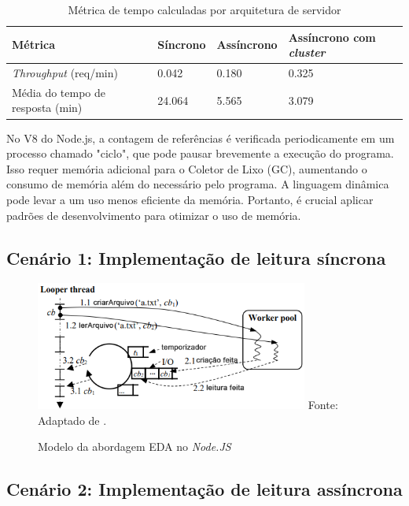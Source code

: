 \documentclass[12pt]{article}
\begin{document}
\begin{table}[!h]
\centering
\caption{Métrica de tempo calculadas por arquitetura de servidor} 
\label{tab:metrics}
\begin{tabular}{|p{3cm}|p{3cm}|p{3cm}|p{3cm}|}
\hline
\textbf{Métrica} & \textbf{Síncrono} & \textbf{Assíncrono} & \textbf{Assíncrono com \textit{cluster}} \\
\hline
\textit{Throughput} (req/min) & 0.042 & 0.180 & 0.325\\
\hline
Média do tempo de resposta (min) & 24.064 & 5.565 & 3.079\\
\hline
\end{tabular}
\end{table}


No V8 do Node.js, a contagem de referências é verificada periodicamente em um processo chamado "ciclo", 
que pode pausar brevemente a execução do programa. Isso requer memória adicional para o Coletor de 
Lixo (GC), aumentando o consumo de memória além do necessário pelo programa. A linguagem dinâmica 
pode levar a um uso menos eficiente da memória. Portanto, é crucial aplicar padrões de desenvolvimento 
para otimizar o uso de memória. \cite[p. 35]{DIOGORESENDE}


\subsection{Cenário 1: Implementação de leitura síncrona}

\begin{figure}[h]
\centering
\caption{Modelo da abordagem EDA no \textit{Node.JS}}
\includegraphics[width=0.8\textwidth]{images/pt-br/eda-arch-nodejs.png}
\label{fig:nodejs_eda_model}
Fonte: Adaptado de \cite{BUGS}.
\end{figure}


\subsection{Cenário 2: Implementação de leitura assíncrona}
 
\end{document}
